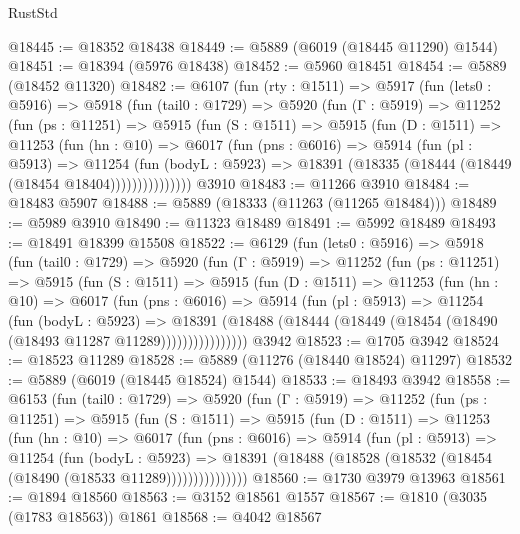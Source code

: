 \begin{lexlean}{RustStd}
\begin{coremodule}
@18445 := @18352 @18438
@18449 := @5889 (@6019 (@18445 @11290) @1544)
@18451 := @18394 (@5976 @18438)
@18452 := @5960 @18451
@18454 := @5889 (@18452 @11320)
@18482 := @6107
    (fun (rty : @1511) =>
    @5917
      (fun (lets0 : @5916) =>
      @5918
        (fun (tail0 : @1729) =>
        @5920
          (fun (Γ : @5919) =>
          @11252
            (fun (ps : @11251) =>
            @5915
              (fun (S : @1511) =>
              @5915
                (fun (D : @1511) =>
                @11253
                  (fun (hn : @10) =>
                  @6017
                    (fun (pns : @6016) =>
                    @5914
                      (fun (pl : @5913) =>
                      @11254
                        (fun (bodyL : @5923) =>
                        @18391 (@18335 (@18444 (@18449 (@18454 @18404)))))))))))))))
    @3910
@18483 := @11266 @3910
@18484 := @18483 @5907
@18488 := @5889 (@18333 (@11263 (@11265 @18484)))
@18489 := @5989 @3910
@18490 := @11323 @18489
@18491 := @5992 @18489
@18493 := @18491 @18399 @15508
@18522 := @6129
    (fun (lets0 : @5916) =>
    @5918
      (fun (tail0 : @1729) =>
      @5920
        (fun (Γ : @5919) =>
        @11252
          (fun (ps : @11251) =>
          @5915
            (fun (S : @1511) =>
            @5915
              (fun (D : @1511) =>
              @11253
                (fun (hn : @10) =>
                @6017
                  (fun (pns : @6016) =>
                  @5914
                    (fun (pl : @5913) =>
                    @11254
                      (fun (bodyL : @5923) =>
                      @18391
                        (@18488
                          (@18444 (@18449 (@18454 (@18490 (@18493 @11287 @11289))))))))))))))))
    @3942
@18523 := @1705 @3942
@18524 := @18523 @11289
@18528 := @5889 (@11276 (@18440 @18524) @11297)
@18532 := @5889 (@6019 (@18445 @18524) @1544)
@18533 := @18493 @3942
@18558 := @6153
    (fun (tail0 : @1729) =>
    @5920
      (fun (Γ : @5919) =>
      @11252
        (fun (ps : @11251) =>
        @5915
          (fun (S : @1511) =>
          @5915
            (fun (D : @1511) =>
            @11253
              (fun (hn : @10) =>
              @6017
                (fun (pns : @6016) =>
                @5914
                  (fun (pl : @5913) =>
                  @11254
                    (fun (bodyL : @5923) =>
                    @18391 (@18488 (@18528 (@18532 (@18454 (@18490 (@18533 @11289)))))))))))))))
@18560 := @1730 @3979 @13963
@18561 := @1894 @18560
@18563 := @3152 @18561 @1557
@18567 := @1810 (@3035 (@1783 @18563)) @1861
@18568 := @4042 @18567

\end{coremodule}
\end{lexlean}

